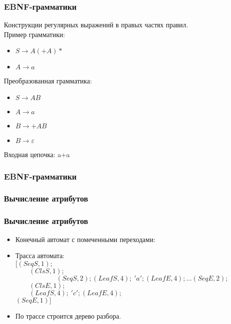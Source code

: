 \documentclass{beamer}
\begin{document}
\begin{frame}
	\transwipe[direction=90]
	\frametitle{EBNF-грамматики}
	Конструкции регулярных выражений в правых частях правил.
  \\
	Пример грамматики: 
		\begin{itemize}
			\item $S \rightarrow A(+A)*$
			\item $A \rightarrow a$
		\end{itemize}
	Преобразованная грамматика:
  \begin{itemize}
		\item $S \rightarrow AB$
		\item $A \rightarrow a$
		\item $B \rightarrow +AB$		
		\item $B \rightarrow \varepsilon$
	\end{itemize}
	Входная цепочка: a+a

\end{frame}

\begin{frame}[t]
	\transwipe[direction=90]
	\frametitle{EBNF-грамматики}
  
   
\end{frame}

\begin{frame}
	\transwipe[direction=90]
	\frametitle{Вычисление атрибутов}
  
  
\end{frame}

\begin{frame}
	\transwipe[direction=90]
	\frametitle{Вычисление атрибутов}
  \begin{itemize}
   \item
    Конечный автомат с помеченными переходами:\\
    
   \item
    Трасса автомата: \\
    $[(SeqS,1);$\\             
    $\phantom \qquad(ClsS,1);$\\
    $\phantom \qquad \qquad \qquad (SeqS,2); (LeafS,4); \ 'a'; (LeafE,4); ... (SeqE,2);$ \\ 
    $\phantom \qquad (ClsE,1); $\\
    $\phantom \qquad (LeafS,4); \ 'c'; (LeafE,4);$\\
    $(SeqE,1)]$
   \item
    По трассе строится дерево разбора.
  \end{itemize}
\end{frame}
\end{document}
